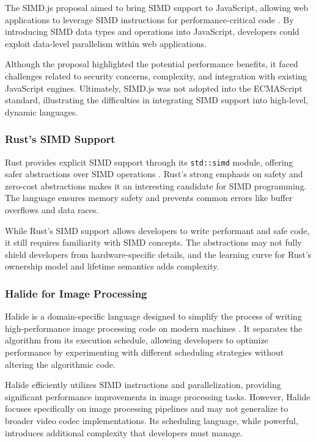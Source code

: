 \documentclass[12pt,a4paper]{article}
\begin{document}
The SIMD.js proposal aimed to bring SIMD support to JavaScript, allowing web applications to leverage SIMD instructions for performance-critical code \citep{Herhut2015SIMDJS}. By introducing SIMD data types and operations into JavaScript, developers could exploit data-level parallelism within web applications.

Although the proposal highlighted the potential performance benefits, it faced challenges related to security concerns, complexity, and integration with existing JavaScript engines. Ultimately, SIMD.js was not adopted into the ECMAScript standard, illustrating the difficulties in integrating SIMD support into high-level, dynamic languages.

\subsubsection{Rust's SIMD Support}

Rust provides explicit SIMD support through its \texttt{std::simd} module, offering safer abstractions over SIMD operations \citep{RustSIMD2023}. Rust's strong emphasis on safety and zero-cost abstractions makes it an interesting candidate for SIMD programming. The language ensures memory safety and prevents common errors like buffer overflows and data races.

While Rust's SIMD support allows developers to write performant and safe code, it still requires familiarity with SIMD concepts. The abstractions may not fully shield developers from hardware-specific details, and the learning curve for Rust's ownership model and lifetime semantics adds complexity.

\subsubsection{Halide for Image Processing}

Halide is a domain-specific language designed to simplify the process of writing high-performance image processing code on modern machines \citep{Ragan2013Halide}. It separates the algorithm from its execution schedule, allowing developers to optimize performance by experimenting with different scheduling strategies without altering the algorithmic code.

Halide efficiently utilizes SIMD instructions and parallelization, providing significant performance improvements in image processing tasks. However, Halide focuses specifically on image processing pipelines and may not generalize to broader video codec implementations. Its scheduling language, while powerful, introduces additional complexity that developers must manage.
\end{document}
